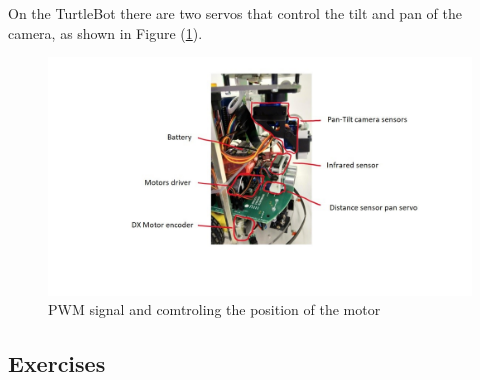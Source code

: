 \documentclass[english]{article}
\begin{document}
\newpage
On the TurtleBot there are two servos that control the tilt and pan of the camera,
as shown in Figure (\ref{fig:motor}).
\begin{figure}[!h]
    \centering
    \includegraphics[width=1.10\textwidth, height=0.35\textheight]{figures/motor.png}
    \caption{PWM signal and comtroling the position of the motor}
    \label{fig:motor}
\end{figure}
\subsection{Exercises}
\end{document}
